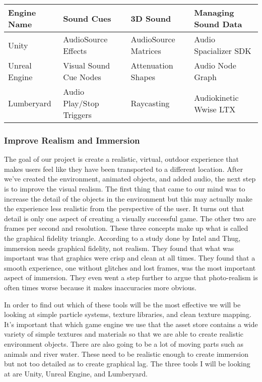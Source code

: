 \documentclass[10pt,journal,compsoc,onecolumn, draftclsnofoot]{IEEEtran}
\begin{document}
\vspace{2mm}
\begin{table}[h!]
\centering
  \begin{tabu} to 1.0\textwidth { | X[l] || X[c] | X[c] | X[c] }
  \hline
  Engine Name & Sound Cues & 3D Sound & Managing Sound Data\\
  \hline
  Unity  & AudioSource Effects & AudioSource Matrices & Audio Spacializer SDK\\
  Unreal Engine & Visual Sound Cue Nodes & Attenuation Shapes & Audio Node Graph\\
  Lumberyard & Audio Play/Stop Triggers & Raycasting & Audiokinetic Wwise LTX\\
  \hline
  \end{tabu}
\end{table}
\vspace{2mm}


\subsubsection{Improve Realism and Immersion}
The goal of our project is create a realistic, virtual, outdoor experience that makes users feel like they have been transported to a different location.
After we’ve created the environment, animated objects, and added audio, the next step is to improve the visual realism.
The first thing that came to our mind was to increase the detail of the objects in the environment but this may actually make the experience less realistic from the perspective of the user.
It turns out that detail is only one aspect of creating a visually successful game.
The other two are frames per second and resolution.
These three concepts make up what is called the graphical fidelity triangle\cite{wilde_2014}.
According to a study done by Intel and Thug\cite{michalak_lind_round1}, immersion needs graphical fidelity, not realism.
They found that what was important was that graphics were crisp and clean at all times.
They found that a smooth experience, one without glitches and lost frames, was the most important aspect of immersion.
They even went a step further to argue that photo-realism is often times worse because it makes inaccuracies more obvious.

In order to find out which of these tools will be the most effective we will be looking at simple particle systems, texture libraries, and clean texture mapping.
It’s important that which game engine we use that the asset store contains a wide variety of simple textures and materials so that we are able to create realistic environment objects.
There are also going to be a lot of moving parts such as animals and river water.
These need to be realistic enough to create immersion but not too detailed as to create graphical lag.
The three tools I will be looking at are Unity, Unreal Engine, and Lumberyard.
\end{document}
